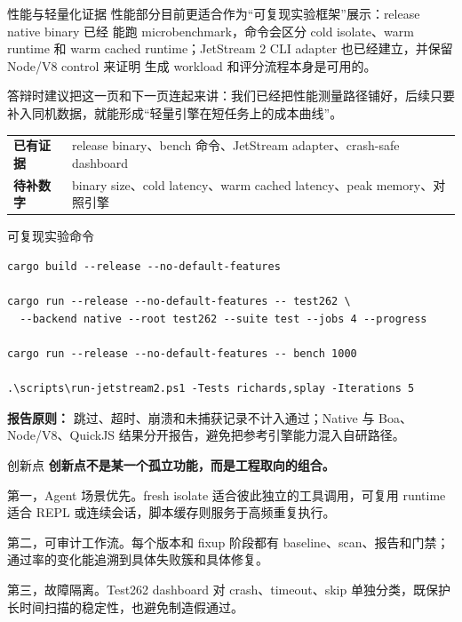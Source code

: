 \documentclass[aspectratio=169,UTF8,fontset=windows]{ctexbeamer}
\newcommand{\leadtext}[1]{%
  {\large\bfseries #1}\par\vspace{0.35em}
}
\begin{document}
\begin{frame}{性能与轻量化证据}
  性能部分目前更适合作为“可复现实验框架”展示：release native binary 已经
  能跑 microbenchmark，命令会区分 cold isolate、warm runtime 和 warm cached
  runtime；JetStream 2 CLI adapter 也已经建立，并保留 Node/V8 control 来证明
  生成 workload 和评分流程本身是可用的。

  \vspace{0.7em}
  答辩时建议把这一页和下一页连起来讲：我们已经把性能测量路径铺好，后续只要
  补入同机数据，就能形成“轻量引擎在短任务上的成本曲线”。

  \vspace{0.8em}
  \begin{tabularx}{\textwidth}{>{\bfseries}p{} X}
    \toprule
    已有证据 & release binary、bench 命令、JetStream adapter、crash-safe dashboard \\
    待补数字 & binary size、cold latency、warm cached latency、peak memory、对照引擎 \\
    \bottomrule
  \end{tabularx}
\end{frame}

\begin{frame}[fragile]{可复现实验命令}
  \begin{lstlisting}[style=cmd]
cargo build --release --no-default-features

cargo run --release --no-default-features -- test262 \
  --backend native --root test262 --suite test --jobs 4 --progress

cargo run --release --no-default-features -- bench 1000

.\scripts\run-jetstream2.ps1 -Tests richards,splay -Iterations 5
  \end{lstlisting}

  \vspace{0.4em}
  \textbf{报告原则：}
  跳过、超时、崩溃和未捕获记录不计入通过；Native 与 Boa、Node/V8、QuickJS
  结果分开报告，避免把参考引擎能力混入自研路径。
\end{frame}

\begin{frame}{创新点}
  \leadtext{创新点不是某一个孤立功能，而是工程取向的组合。}

  第一，Agent 场景优先。fresh isolate 适合彼此独立的工具调用，可复用 runtime
  适合 REPL 或连续会话，脚本缓存则服务于高频重复执行。

  \vspace{0.45em}
  第二，可审计工作流。每个版本和 fixup 阶段都有 baseline、scan、报告和门禁；
  通过率的变化能追溯到具体失败簇和具体修复。

  \vspace{0.45em}
  第三，故障隔离。Test262 dashboard 对 crash、timeout、skip 单独分类，既保护
  长时间扫描的稳定性，也避免制造假通过。
\end{frame}
\end{document}
